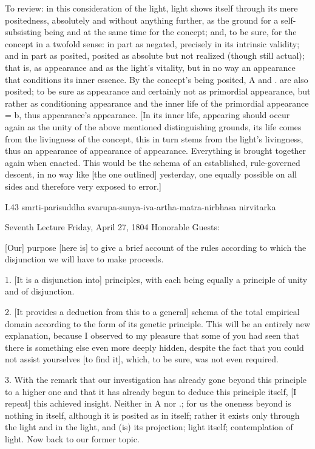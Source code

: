 To review: in this consideration of the light,
light shows itself through its mere positedness,
absolutely and without anything further,
as the ground for a self-subsisting being
and at the same time for the concept;
and, to be sure, for the concept in a twofold sense:
in part as negated, precisely in its intrinsic validity;
and in part as posited, posited as absolute
but not realized (though still actual);
that is, as appearance and as the light's vitality,
but in no way an appearance that conditions its inner essence.
By the concept's being posited,
A and . are also posited;
to be sure as appearance
and certainly not as primordial appearance,
but rather as conditioning appearance
and the inner life of the primordial appearance = b,
thus appearance's appearance.
[In its inner life,
appearing should occur again as
the unity of the above mentioned distinguishing grounds,
its life comes from the livingness of the concept,
this in turn stems from the light's livingness,
thus an appearance of appearance of appearance.
Everything is brought together again when enacted.
This would be the schema of
an established, rule-governed descent,
in no way like [the one outlined] yesterday,
one equally possible on all sides
and therefore very exposed to error.]

I.43
smrti-parisuddha svarupa-sunya-iva-artha-matra-nirbhasa nirvitarka

Seventh Lecture
Friday, April 27, 1804
Honorable Guests:

[Our] purpose [here is] to give a brief account of
the rules according to which the disjunction
we will have to make proceeds.

1. [It is a disjunction into] principles,
with each being equally a principle
of unity and of disjunction.

2. [It provides a deduction from this to a general]
schema of the total empirical domain
according to the form of its genetic principle.
This will be an entirely new explanation,
because I observed to my pleasure that
some of you had seen that there is
something else even more deeply hidden,
despite the fact that you could not
assist yourselves [to find it],
which, to be sure, was not even required.

3. With the remark that our investigation has
already gone beyond this principle to a higher one
and that it has already begun to deduce this principle itself,
[I repeat] this achieved insight.
Neither in A nor .;
for us the oneness beyond is nothing in itself,
although it is posited as in itself;
rather it exists only through the light
and in the light, and (is) its projection;
light itself; contemplation of light.
Now back to our former topic.

